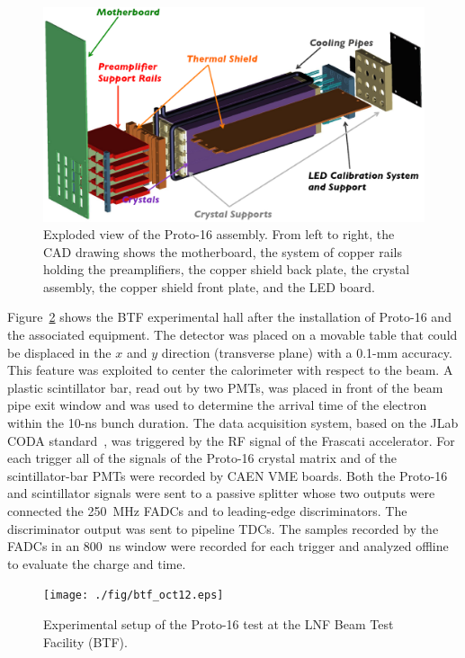 \begin{figure}
\includegraphics[width=1.0\columnwidth]{./fig/p16-whole.eps}
\caption{Exploded view of the Proto-16 assembly. From left to right, the CAD drawing shows the motherboard, the
  system of copper rails holding the preamplifiers, the copper shield back plate, the crystal assembly, the copper
  shield front plate, and the LED board.}
\label{fig:p16-whole}
\end{figure}

Figure~\ref{fig:btf} shows the BTF experimental hall after the installation of Proto-16 and the associated equipment.
The detector was placed on a movable table that could be displaced in the $x$ and $y$ direction (transverse
plane) with a 0.1-mm accuracy. This feature was exploited to center the calorimeter with respect to the beam. A
plastic scintillator bar, read out by two PMTs, was placed in front of the beam pipe exit window and was used to
determine the arrival time of the electron within the 10-ns bunch duration. The data acquisition system, based on the
JLab CODA standard~\cite{daq}, was triggered by the RF signal of the Frascati accelerator. For each trigger all of
the signals of the Proto-16 crystal matrix and of the scintillator-bar PMTs were recorded by CAEN VME boards. Both
the Proto-16 and scintillator signals were sent to a passive splitter whose two outputs were connected the 250~MHz
FADCs and to leading-edge discriminators. The discriminator output was sent to pipeline TDCs. The samples recorded
by the FADCs in an 800~ns window were recorded for each trigger and analyzed offline to evaluate the charge and time.

\begin{figure}
\texttt{[image: ./fig/btf\_oct12.eps]}
\caption{Experimental setup of the Proto-16 test at the LNF Beam Test Facility (BTF).}
\label{fig:btf}
\end{figure}

